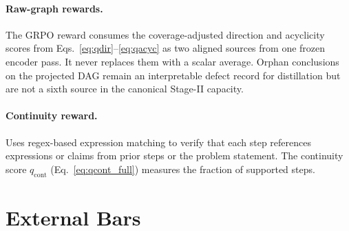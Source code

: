 \paragraph{Raw-graph rewards.}
The GRPO reward consumes the coverage-adjusted direction and acyclicity scores from Eqs.~\eqref{eq:qdir}--\eqref{eq:qacyc} as two aligned sources from one frozen encoder pass. It never replaces them with a scalar average. Orphan conclusions on the projected DAG remain an interpretable defect record for distillation but are not a sixth source in the canonical Stage-II capacity.

\paragraph{Continuity reward.}
Uses regex-based expression matching to verify that each step references expressions or claims from prior steps or the problem statement.
The continuity score $q_{\mathrm{cont}}$ (Eq.~\ref{eq:qcont_full}) measures the fraction of supported steps.

\section{External Bars}
\label{app:external_bars}

